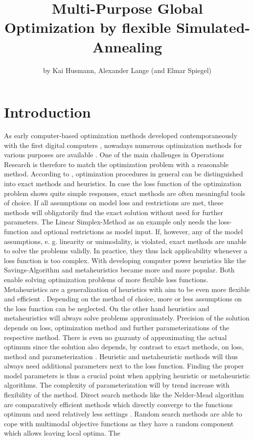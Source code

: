 \title{Multi-Purpose Global Optimization by flexible Simulated-Annealing}
\author{by Kai Husmann, Alexander Lange (and Elmar Spiegel)}

\maketitle


\section{Introduction}

As early computer-based optimization methods developed contemporaneously with the first digital computers \citep{corana_1987}, nowadays numerous optimization methods for various purposes are available \citep{wegener_2005}. One of the main challenges in Operations Research is therefore to match the optimization problem with a reasonable method. According to  \citet{kirkpatrick_1983}, optimization procedures in general can be distinguished into exact methods and heuristics. In case the loss function of the optimization problem shows quite simple responses, exact methods are often meaningful tools of choice. If all assumptions on model loss and restrictions are met, these methods will obligatorily find the exact solution without need for further parameters. The  Linear Simplex-Method \citep{dantzig_1959} as an example only needs the loss-function and optional restrictions as model input. If, however, any of the model assumptions, e. g. linearity or unimodality, is violated, exact methods are unable to solve the problems validly. In practice, they thus lack applicability whenever a loss function is too complex. With developing computer power heuristics like the Savings-Algorithm \citep{clarke_1964} and metaheuristics became more and more popular. Both enable solving optimization problems of more flexible loss functions. Metaheuristics are a generalization of heuristics with aim to be even more flexible and efficient \citep{blum_2003}. Depending on the method of choice, more or less assumptions on the loss function can be neglected. On the other hand heuristics and metaheuristics will always solve problems approximately. Precision of the solution depends on loss, optimization method and further parameterizations of the respective method. There is even no guaranty of approximating the actual optimum since the solution also depends, by contrast to exact methods, on loss, method and parameterization \citep{blum_2003}. Heuristic and metaheuristic methods will thus always need additional parameters next to the loss function. Finding the proper model parameters is thus a crucial point when applying heuristic or metaheuristic algorithms. The complexity of parameterization will by trend increase with flexibility of the method. Direct search methods like the Nelder-Mead algorithm are comparatively efficient methods which directly converge to the functions optimum and need relatively less settings \citep{geiger_1999}. Random search methods are able to cope with multimodal objective functions as they have a random component which allows leaving local optima. The 